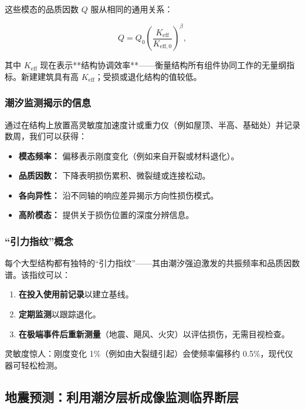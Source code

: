 \documentclass[12pt,a4paper]{article}
\theoremstyle{remark}
\begin{document}
	这些模态的品质因数 \(Q\) 服从相同的通用关系：
	
	\begin{equation}
		Q = Q_0 \left( \frac{K_{\mathrm{eff}}}{K_{\mathrm{eff},0}} \right)^{\beta},
		\label{eq:structural-Q}
	\end{equation}
	
	其中 \(K_{\mathrm{eff}}\) 现在表示**结构协调效率**——衡量结构所有组件协同工作的无量纲指标。新建建筑具有高 \(K_{\mathrm{eff}}\)；受损或退化结构的值较低。
	
	\subsubsection{潮汐监测揭示的信息}
	
	通过在结构上放置高灵敏度加速度计或重力仪（例如屋顶、半高、基础处）并记录数周，我们可以获得：
	
	\begin{itemize}
		\item \textbf{模态频率：} 偏移表示刚度变化（例如来自开裂或材料退化）。
		\item \textbf{品质因数：} 下降表明损伤累积、微裂缝或连接松动。
		\item \textbf{各向异性：} 沿不同轴的响应差异揭示方向性损伤模式。
		\item \textbf{高阶模态：} 提供关于损伤位置的深度分辨信息。
	\end{itemize}
	
	\subsubsection{“引力指纹”概念}
	
	每个大型结构都有独特的“引力指纹”——其由潮汐强迫激发的共振频率和品质因数谱。该指纹可以：
	\begin{enumerate}
		\item \textbf{在投入使用前记录}以建立基线。
		\item \textbf{定期监测}以跟踪退化。
		\item \textbf{在极端事件后重新测量}（地震、飓风、火灾）以评估损伤，无需目视检查。
	\end{enumerate}
	
	灵敏度惊人：刚度变化 1\%（例如由大裂缝引起）会使频率偏移约 0.5\%，现代仪器可轻松检测。
	
	\subsection{地震预测：利用潮汐层析成像监测临界断层}
	\label{sec:earthquakes}
	
\end{document}
